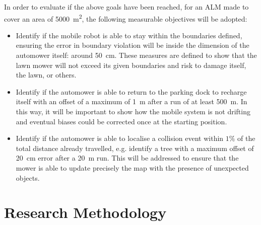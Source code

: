 In order to evaluate if the above goals have been reached, for an \gls{ALM} made to cover an area of \SI{5000}{\meter\squared}, the following measurable objectives will be adopted: 
\begin{itemize}
    \item Identify if the mobile robot is able to stay within the boundaries defined, ensuring the error in boundary violation will be inside the dimension of the automower itself: around \SI{50}{\cm}.
    These measures are defined to show that the lawn mower will not exceed its given boundaries and risk to damage itself, the lawn, or others.
    \item Identify if the automower is able to return to the parking dock to recharge itself with an offset of a maximum of \SI{1}{\m} after a run of at least \SI{500}{\m}. In this way, it will be important to show how the mobile system is not drifting and eventual biases could be corrected once at the starting position.
    \item Identify if the automower is able to localise a collision event within $1\%$ of the total distance already travelled, e.g. identify a tree with a maximum offset of \SI{20}{\cm} error after a \SI{20}{\m} run.
    This will be addressed to ensure that the mower is able to update precisely the map with the presence of unexpected objects.
\end{itemize}



\section{Research Methodology}


